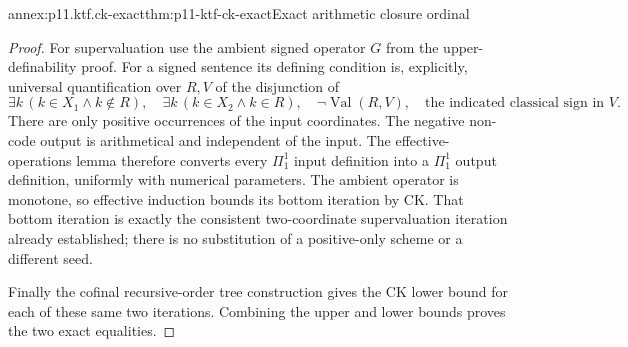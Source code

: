 \begin{annexitem}{annex:p11.ktf.ck-exact}{thm:p11-ktf-ck-exact}{Exact arithmetic closure ordinal}
\begin{proof}
For supervaluation use the ambient signed operator \(G\) from the
upper-definability proof. For a signed sentence its defining
condition is, explicitly, universal quantification over \(R,V\)
of the disjunction of
\[
 \exists k\,(k\in X_1\land k\notin R),\quad
 \exists k\,(k\in X_2\land k\in R),\quad
 \neg\operatorname{Val}(R,V),\quad
 \text{the indicated classical sign in }V.
\]
There are only positive occurrences of the input coordinates.
The negative non-code output is arithmetical and independent of
the input. The effective-operations lemma therefore converts every
\(\Pi^1_1\) input definition into a \(\Pi^1_1\) output
definition, uniformly with numerical parameters. The ambient
operator is monotone, so effective induction bounds its bottom
iteration by CK. That bottom iteration is exactly the consistent
two-coordinate supervaluation iteration already established; there
is no substitution of a positive-only scheme or a different seed.

Finally the cofinal recursive-order tree construction gives the
CK lower bound for each of these same two iterations. Combining
the upper and lower bounds proves the two exact equalities.
\end{proof}
\end{annexitem}

